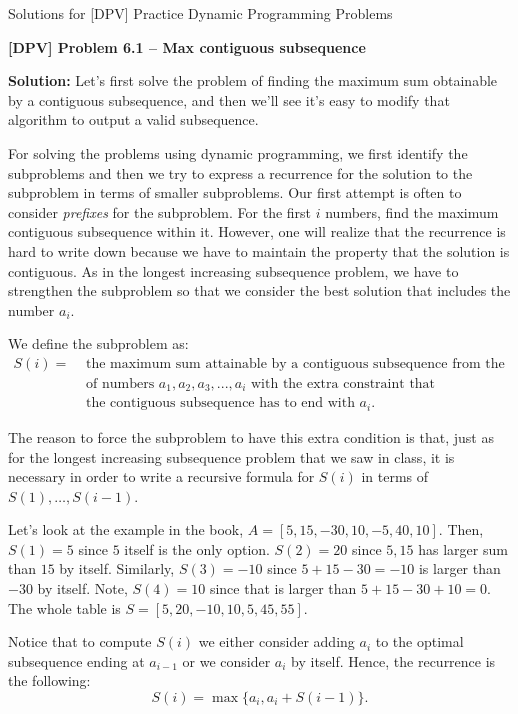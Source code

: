 \documentclass[12pt]{article}
\begin{document}
\begin{center}
{\large 
Solutions for [DPV] Practice Dynamic Programming Problems} \\
\end{center}

{\noindent \bf [DPV] Problem 6.1 --  Max contiguous subsequence}

{\noindent \bf Solution:}
Let's first solve the problem of finding the maximum sum obtainable by a contiguous
subsequence, and then we'll see it's easy to modify that algorithm to output a valid
subsequence.

For solving the problems using dynamic programming, we first identify the subproblems and then
we try to express a recurrence for the solution to the subproblem in
terms of smaller subproblems.
Our first attempt is often to consider {\em prefixes} for the subproblem.
For the first $i$ numbers, find the maximum contiguous subsequence within it.
However, one will realize that the recurrence is hard to write down because we have to
maintain  the property that the solution is contiguous.
As in the longest increasing
subsequence problem, we have to strengthen the subproblem so that we consider
the best solution that includes the number $a_i$.

We define the subproblem as:
\begin{eqnarray*}
S(i) = & \mbox{ the maximum sum attainable by a contiguous subsequence from the list } \\
& \mbox{ of numbers $a_1,a_2,a_3,...,a_i$ with the extra constraint that } \\
& \mbox{ the contiguous subsequence has to end with $a_i$. }
\end{eqnarray*}

The reason to force the subproblem to have this extra condition is that, just
as for the longest increasing subsequence problem that we saw in class, it is 
necessary in order to write a recursive formula for $S(i)$ in terms of $S(1),\dots, S(i-1)$.

Let's look at the example in the book, $A = [5, 15, -30, 10, -5, 40, 10]$.
Then, $S(1) = 5$ since $5$ itself is the only option.
$S(2)=20$ since $5,15$ has larger sum than $15$ by itself.
Similarly, $S(3) = -10$ since $5+15-30 =-10$ is larger than $-30$ by itself.
Note, $S(4)=10$ since that is larger than $5+15-30+10=0$.
The whole table is $S = [5, 20, -10, 10, 5, 45, 55]$.

Notice that to compute $S(i)$ we either consider adding $a_i$ to the optimal
subsequence ending at $a_{i-1}$ or we consider $a_i$ by itself.
Hence, the recurrence is the following:
\[ S(i) = \max\{ a_i, a_i+S(i-1)\}.
\]
\end{document}
